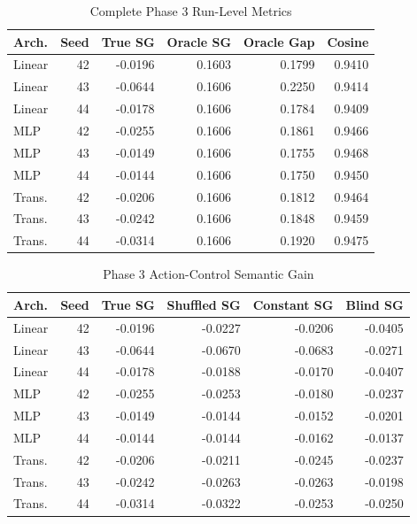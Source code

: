 \documentclass[conference]{IEEEtran}
\begin{document}
\begin{table}[t]
\centering
\caption{Complete Phase 3 Run-Level Metrics}
\label{tab:raw_results_app}
\small
\setlength{\tabcolsep}{3pt}
\begin{tabular}{@{}lrrrrr@{}}
\toprule
Arch. & Seed & True SG & Oracle SG & Oracle Gap & Cosine \\
\midrule
Linear & 42 & -0.0196 & 0.1603 & 0.1799 & 0.9410 \\
Linear & 43 & -0.0644 & 0.1606 & 0.2250 & 0.9414 \\
Linear & 44 & -0.0178 & 0.1606 & 0.1784 & 0.9409 \\
MLP & 42 & -0.0255 & 0.1606 & 0.1861 & 0.9466 \\
MLP & 43 & -0.0149 & 0.1606 & 0.1755 & 0.9468 \\
MLP & 44 & -0.0144 & 0.1606 & 0.1750 & 0.9450 \\
Trans. & 42 & -0.0206 & 0.1606 & 0.1812 & 0.9464 \\
Trans. & 43 & -0.0242 & 0.1606 & 0.1848 & 0.9459 \\
Trans. & 44 & -0.0314 & 0.1606 & 0.1920 & 0.9475 \\
\bottomrule
\end{tabular}
\end{table}

\begin{table}[t]
\centering
\caption{Phase 3 Action-Control Semantic Gain}
\label{tab:action_controls_app}
\small
\setlength{\tabcolsep}{3pt}
\begin{tabular}{@{}lrrrrr@{}}
\toprule
Arch. & Seed & True SG & Shuffled SG & Constant SG & Blind SG \\
\midrule
Linear & 42 & -0.0196 & -0.0227 & -0.0206 & -0.0405 \\
Linear & 43 & -0.0644 & -0.0670 & -0.0683 & -0.0271 \\
Linear & 44 & -0.0178 & -0.0188 & -0.0170 & -0.0407 \\
MLP & 42 & -0.0255 & -0.0253 & -0.0180 & -0.0237 \\
MLP & 43 & -0.0149 & -0.0144 & -0.0152 & -0.0201 \\
MLP & 44 & -0.0144 & -0.0144 & -0.0162 & -0.0137 \\
Trans. & 42 & -0.0206 & -0.0211 & -0.0245 & -0.0237 \\
Trans. & 43 & -0.0242 & -0.0263 & -0.0263 & -0.0198 \\
Trans. & 44 & -0.0314 & -0.0322 & -0.0253 & -0.0250 \\
\bottomrule
\end{tabular}
\end{table}
\end{document}
